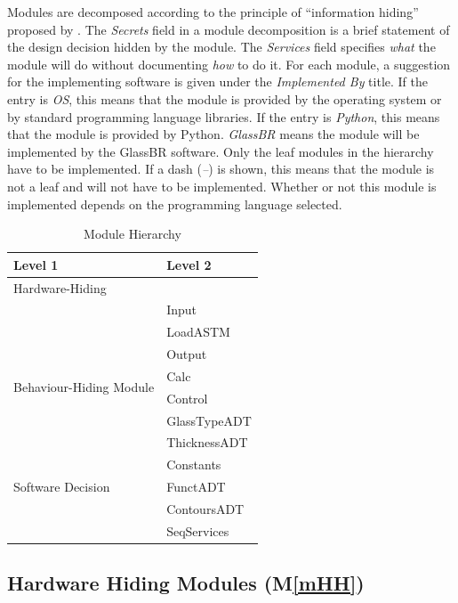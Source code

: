 \documentclass[12pt]{article}
\newcommand{\mref}[1]{M\ref{#1}}
\newcommand{\progname}{GlassBR}
\begin{document}
Modules are decomposed according to the principle of ``information hiding''
proposed by \citet{ParnasEtAl1984}. The \emph{Secrets} field in a module
decomposition is a brief statement of the design decision hidden by the
module. The \emph{Services} field specifies \emph{what} the module will do
without documenting \emph{how} to do it. For each module, a suggestion for the
implementing software is given under the \emph{Implemented By} title. If the
entry is \emph{OS}, this means that the module is provided by the operating
system or by standard programming language libraries. If the entry is
\emph{Python}, this means that the module is provided by Python.  
\emph{\progname} means the module will be implemented by the \progname{} software.  
Only the leaf modules in the
hierarchy have to be implemented. If a dash (\emph{--}) is shown, this means
that the module is not a leaf and will not have to be implemented. Whether or
not this module is implemented depends on the programming language
selected.

\begin{table}[h!]
\centering
\begin{tabular}{p{} p{}}
\toprule
\textbf{Level 1} & \textbf{Level 2}\\
\midrule

{Hardware-Hiding} & ~ \\
\midrule

\multirow{8}{0.3\textwidth}{Behaviour-Hiding Module} 
& Input\\
& LoadASTM\\
& Output\\
& Calc\\
& Control\\
& GlassTypeADT\\
& ThicknessADT\\
& Constants\\

\midrule

\multirow{1}{0.3\textwidth}{Software Decision}
& FunctADT\\
& ContoursADT\\
& SeqServices\\

\bottomrule

\end{tabular}
\caption{Module Hierarchy}
\label{TblMH}
\end{table}

\subsection{Hardware Hiding Modules (\mref{mHH})}
\end{document}
